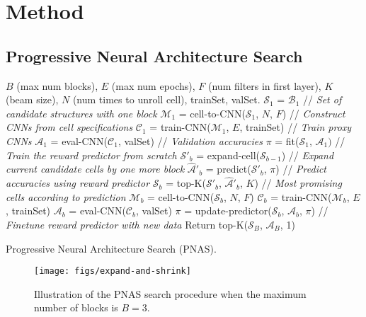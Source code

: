 \documentclass[runningheads]{llncs}
\begin{document}
\section{Method}\label{sec:methods}\label{sec:method}\subsection{Progressive Neural Architecture Search}\label{sec:pnas}\begin{algorithm}[t]
\begin{algorithmic}
$B$ (max num blocks),
$E$ (max num epochs),
$F$ (num filters in first layer),
$K$ (beam size),
$N$ (num times to unroll cell),
trainSet,
valSet.
\STATE $\mathcal{S}_1$ = $\mathcal{B}_1$ // {\it Set of candidate structures with one block}
\STATE $\mathcal{M}_1$ = cell-to-CNN($\mathcal{S}_1$, $N$, $F$) // {\it Construct CNNs from cell specifications}
\STATE $\mathcal{C}_1$ = train-CNN($\mathcal{M}_1$, $E$, trainSet) //  {\it Train proxy CNNs}
\STATE $\mathcal{A}_1$ = eval-CNN($\mathcal{C}_1$, valSet) //  {\it Validation accuracies}
\STATE $\pi$ = fit($\mathcal{S}_1$, $\mathcal{A}_1)$ // {\it Train the reward predictor from scratch}
\STATE $\mathcal{S}'_b$ = expand-cell($\mathcal{S}_{b-1}$) // {\it Expand current candidate cells by one more block}
\STATE $\hat{\mathcal{A}}'_b$ = predict($\mathcal{S}'_b$, $\pi$) // {\it Predict accuracies using reward predictor}
\STATE $\mathcal{S}_b$ = top-K($\mathcal{S}'_b$, $\hat{\mathcal{A}}'_b$, $K$) // {\it Most promising cells according to prediction}
\STATE $\mathcal{M}_b$ = cell-to-CNN($\mathcal{S}_b$, $N$, $F$)
\STATE $\mathcal{C}_b$ = train-CNN($\mathcal{M}_b$, $E$, trainSet) 
\STATE $\mathcal{A}_b$ = eval-CNN($\mathcal{C}_b$, valSet) 
\STATE $\pi$ = update-predictor($\mathcal{S}_b$, $\mathcal{A}_b$, $\pi$) // {\it Finetune reward predictor with new data}
\ENDFOR
\STATE Return top-K($\mathcal{S}_B$, $\mathcal{A}_B$, 1) 
\end{algorithmic}
\caption{Progressive Neural Architecture Search (PNAS).
}
\label{alg:pnas}
\end{algorithm}\begin{figure}[t]
    \centering
    \begin{minipage}[c]{0.49\textwidth}
    \texttt{[image: figs/expand-and-shrink]}
    \end{minipage} \hfill
    \begin{minipage}[c]{0.5\textwidth}
    \caption{Illustration of the PNAS search procedure when the maximum number of blocks is $B=3$.
}
\end{minipage}
\end{figure}
\end{document}
